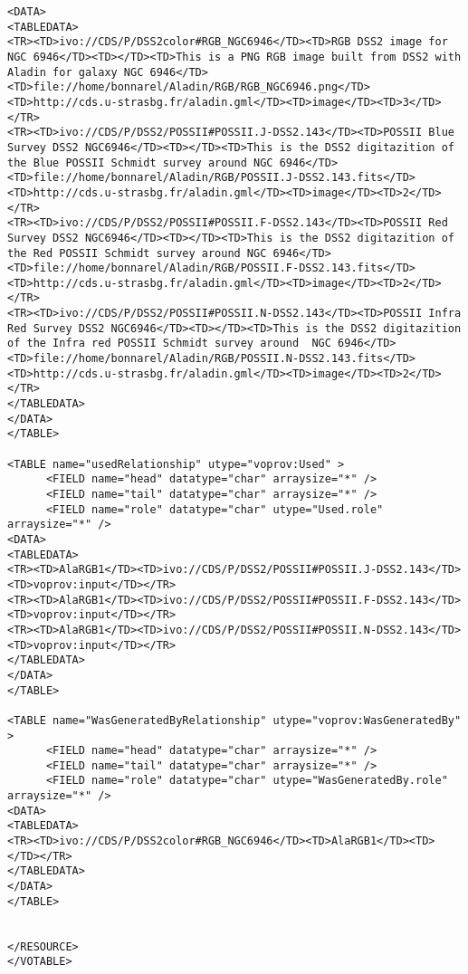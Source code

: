 \begin{itemize}
\begin{verbatim}
<DATA>
<TABLEDATA>
<TR><TD>ivo://CDS/P/DSS2color#RGB_NGC6946</TD><TD>RGB DSS2 image for NGC 6946</TD><TD></TD><TD>This is a PNG RGB image built from DSS2 with Aladin for galaxy NGC 6946</TD><TD>file://home/bonnarel/Aladin/RGB/RGB_NGC6946.png</TD><TD>http://cds.u-strasbg.fr/aladin.gml</TD><TD>image</TD><TD>3</TD></TR>
<TR><TD>ivo://CDS/P/DSS2/POSSII#POSSII.J-DSS2.143</TD><TD>POSSII Blue Survey DSS2 NGC6946</TD><TD></TD><TD>This is the DSS2 digitazition of the Blue POSSII Schmidt survey around NGC 6946</TD><TD>file://home/bonnarel/Aladin/RGB/POSSII.J-DSS2.143.fits</TD><TD>http://cds.u-strasbg.fr/aladin.gml</TD><TD>image</TD><TD>2</TD></TR>
<TR><TD>ivo://CDS/P/DSS2/POSSII#POSSII.F-DSS2.143</TD><TD>POSSII Red Survey DSS2 NGC6946</TD><TD></TD><TD>This is the DSS2 digitazition of the Red POSSII Schmidt survey around NGC 6946</TD><TD>file://home/bonnarel/Aladin/RGB/POSSII.F-DSS2.143.fits</TD><TD>http://cds.u-strasbg.fr/aladin.gml</TD><TD>image</TD><TD>2</TD></TR>
<TR><TD>ivo://CDS/P/DSS2/POSSII#POSSII.N-DSS2.143</TD><TD>POSSII Infra Red Survey DSS2 NGC6946</TD><TD></TD><TD>This is the DSS2 digitazition of the Infra red POSSII Schmidt survey around  NGC 6946</TD><TD>file://home/bonnarel/Aladin/RGB/POSSII.N-DSS2.143.fits</TD><TD>http://cds.u-strasbg.fr/aladin.gml</TD><TD>image</TD><TD>2</TD></TR>
</TABLEDATA>
</DATA>
</TABLE>

<TABLE name="usedRelationship" utype="voprov:Used" >
      <FIELD name="head" datatype="char" arraysize="*" />
      <FIELD name="tail" datatype="char" arraysize="*" />
      <FIELD name="role" datatype="char" utype="Used.role" arraysize="*" />
<DATA>
<TABLEDATA>
<TR><TD>AlaRGB1</TD><TD>ivo://CDS/P/DSS2/POSSII#POSSII.J-DSS2.143</TD><TD>voprov:input</TD></TR>
<TR><TD>AlaRGB1</TD><TD>ivo://CDS/P/DSS2/POSSII#POSSII.F-DSS2.143</TD><TD>voprov:input</TD></TR>
<TR><TD>AlaRGB1</TD><TD>ivo://CDS/P/DSS2/POSSII#POSSII.N-DSS2.143</TD><TD>voprov:input</TD></TR>
</TABLEDATA>
</DATA>
</TABLE>

<TABLE name="WasGeneratedByRelationship" utype="voprov:WasGeneratedBy" >
      <FIELD name="head" datatype="char" arraysize="*" />
      <FIELD name="tail" datatype="char" arraysize="*" />
      <FIELD name="role" datatype="char" utype="WasGeneratedBy.role" arraysize="*" />
<DATA>
<TABLEDATA>
<TR><TD>ivo://CDS/P/DSS2color#RGB_NGC6946</TD><TD>AlaRGB1</TD><TD></TD></TR>
</TABLEDATA>
</DATA>
</TABLE>


</RESOURCE>
</VOTABLE>

\end{verbatim}
  
  
\end{itemize}


